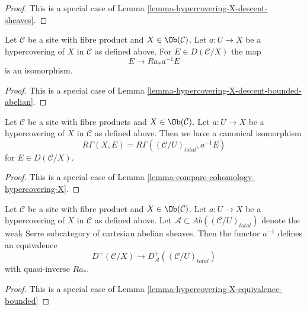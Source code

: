 \begin{proof}
This is a special case of
Lemma \ref{lemma-hypercovering-X-descent-sheaves}.
\end{proof}

\begin{lemma}
\label{lemma-hypercovering-X-simple-descent-bounded-abelian}
Let $\mathcal{C}$ be a site with fibre product and $X \in \Ob(\mathcal{C})$.
Let $a : U \to X$ be a hypercovering of $X$ in $\mathcal{C}$ as defined above.
For $E \in D(\mathcal{C}/X)$ the map
$$
E \longrightarrow Ra_*a^{-1}E
$$
is an isomorphism.
\end{lemma}

\begin{proof}
This is a special case of
Lemma \ref{lemma-hypercovering-X-descent-bounded-abelian}.
\end{proof}

\begin{lemma}
\label{lemma-compare-cohomology-hypercovering-X-simple}
Let $\mathcal{C}$ be a site with fibre products and $X \in \Ob(\mathcal{C})$.
Let $a : U \to X$ be a hypercovering of $X$ in $\mathcal{C}$ as defined above.
Then we have a canonical isomorphism
$$
R\Gamma(X, E) = R\Gamma((\mathcal{C}/U)_{total}, a^{-1}E)
$$
for $E \in D(\mathcal{C}/X)$.
\end{lemma}

\begin{proof}
This is a special case of
Lemma \ref{lemma-compare-cohomology-hypercovering-X}.
\end{proof}

\begin{lemma}
\label{lemma-hypercovering-X-simple-equivalence-bounded}
Let $\mathcal{C}$ be a site with fibre product and $X \in \Ob(\mathcal{C})$.
Let $a : U \to X$ be a hypercovering of $X$ in $\mathcal{C}$ as defined above.
Let $\mathcal{A} \subset \textit{Ab}((\mathcal{C}/U)_{total})$
denote the weak Serre subcategory of cartesian abelian sheaves.
Then the functor $a^{-1}$ defines an equivalence
$$
D^+(\mathcal{C}/X) \longrightarrow D_\mathcal{A}^+((\mathcal{C}/U)_{total})
$$
with quasi-inverse $Ra_*$.
\end{lemma}

\begin{proof}
This is a special case of
Lemma \ref{lemma-hypercovering-X-equivalence-bounded}
\end{proof}

